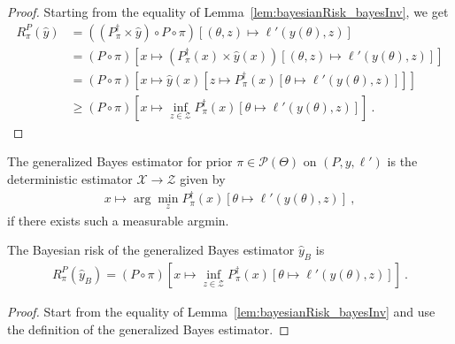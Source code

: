 \begin{proof}\mathlibok
{}
Starting from the equality of Lemma~\ref{lem:bayesianRisk_bayesInv}, we get
\begin{align*}
R^P_\pi(\hat{y})
&= ((P_\pi^\dagger \times \hat{y}) \circ P \circ \pi)\left[(\theta, z) \mapsto \ell'(y(\theta), z)\right]
\\
&= (P \circ \pi)\left[x \mapsto (P_\pi^\dagger(x) \times \hat{y}(x)) \left[(\theta, z) \mapsto \ell'(y(\theta), z)\right]\right]
\\
&= (P \circ \pi)\left[x \mapsto \hat{y}(x)\left[z \mapsto P_\pi^\dagger(x) \left[\theta \mapsto \ell'(y(\theta), z)\right]\right]\right]
\\
&\ge (P \circ \pi)\left[x \mapsto \inf_{z \in \mathcal Z} P_\pi^\dagger(x) \left[\theta \mapsto \ell'(y(\theta), z)\right]\right]
\: .
\end{align*}

\end{proof}

\begin{definition}
  \label{def:genBayesEstimator}
  \mathlibok
  The generalized Bayes estimator for prior $\pi \in \mathcal P(\Theta)$ on $(P, y, \ell')$ is the deterministic estimator $\mathcal X \to \mathcal Z$ given by
  \begin{align*}
  x \mapsto \arg\min_z P_\pi^\dagger(x)\left[\theta \mapsto \ell'(y(\theta), z)\right] \: ,
  \end{align*}
  if there exists such a measurable argmin.
\end{definition}


\begin{lemma}
  \label{lem:bayesianRisk_genBayesEstimator}
  \mathlibok
  The Bayesian risk of the generalized Bayes estimator $\hat{y}_B$ is
  \begin{align*}
  R^P_\pi(\hat{y}_B) = (P \circ \pi)\left[x \mapsto \inf_{z \in \mathcal Z} P_\pi^\dagger(x) \left[\theta \mapsto \ell'(y(\theta), z)\right]\right]
  \: .
  \end{align*}
\end{lemma}

\begin{proof}\mathlibok
{}
Start from the equality of Lemma~\ref{lem:bayesianRisk_bayesInv} and use the definition of the generalized Bayes estimator.
\end{proof}

